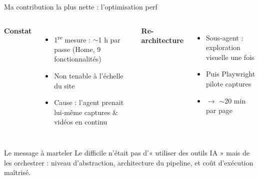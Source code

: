 \begin{frame}{Ma contribution la plus nette : l'optimisation perf}
  \begin{columns}[T]
    \textbf{Constat}
    \begin{itemize}\footnotesize
      \item 1\textsuperscript{re} mesure : $\sim$\alert{1 h} par passe (Home, 9 fonctionnalités)
      \item Non tenable à l'échelle du site
      \item Cause : l'agent prenait lui-même captures \& vidéos en continu
    \end{itemize}
    \textbf{Re-architecture}
    \begin{itemize}\footnotesize
      \item Sous-agent : exploration \alert{visuelle une fois}
      \item Puis \alert{Playwright} pilote captures
      \item $\to$ \alert{$\sim$20 min} par page
    \end{itemize}
  \end{columns}
  \vskip 6pt
  \begin{alertblock}{Le message à marteler}
    Le difficile n'était pas d'« utiliser des outils IA » mais de les \alert{orchestrer} :
    niveau d'abstraction, architecture du pipeline, et coût d'exécution maîtrisé.
  \end{alertblock}
\end{frame}
